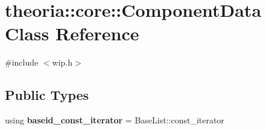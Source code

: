 \hypertarget{classtheoria_1_1core_1_1ComponentData}{}\section{theoria\+:\+:core\+:\+:Component\+Data Class Reference}
\label{classtheoria_1_1core_1_1ComponentData}


{\ttfamily \#include $<$wip.\+h$>$}

\subsection*{Public Types}
\begin{DoxyCompactItemize}
\item 
\mbox{\label{classtheoria_1_1core_1_1ComponentData_a66b4a86a617891cfd780d447c82b88b0}} 
using {\bfseries baseid\+\_\+const\+\_\+iterator} = Base\+List\+::const\+\_\+iterator
\end{DoxyCompactItemize}
